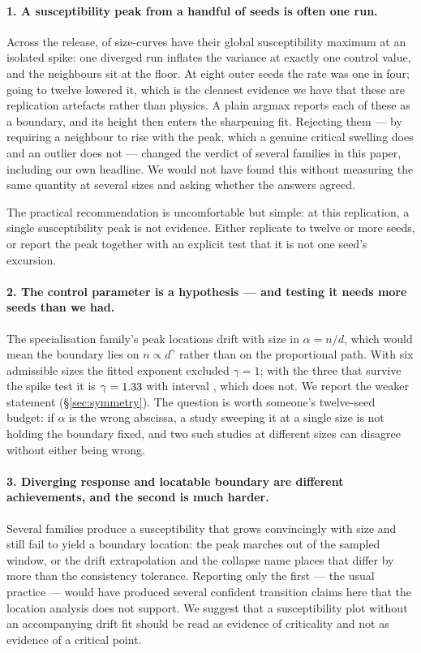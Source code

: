 \paragraph{1. A susceptibility peak from a handful of seeds is often one run.}
Across the release, \AtlasSpikeRejected{} of \AtlasSpikeTotal{} size-curves have
their global susceptibility maximum at an isolated spike: one diverged run
inflates the variance at exactly one control value, and the neighbours sit at
the floor. At eight outer seeds the rate was one in four; going to twelve
lowered it, which is the cleanest evidence we have that these are replication
artefacts rather than physics. A plain argmax reports each of these as a boundary, and its
height then enters the sharpening fit. Rejecting them --- by requiring a
neighbour to rise with the peak, which a genuine critical swelling does and an
outlier does not --- changed the verdict of several families in this paper,
including our own headline. We would not have found this without measuring the
same quantity at several sizes and asking whether the answers agreed.

The practical recommendation is uncomfortable but simple: at this replication,
a single susceptibility peak is not evidence. Either replicate to twelve or
more seeds, or report the peak together with an explicit test that it is not
one seed's excursion.

\paragraph{2. The control parameter is a hypothesis --- and testing it needs
more seeds than we had.}
The specialisation family's peak locations drift with size in $\alpha=n/d$,
which would mean the boundary lies on $n\propto d^{\gamma}$ rather than on the
proportional path. With six admissible sizes the fitted exponent excluded
$\gamma=1$; with the three that survive the spike test it is
$\gamma=1.33{}$ with interval
\AtlasSpecializationGammaCI{}, which does not. We report the weaker statement
(\S\ref{sec:symmetry}). The question is worth someone's twelve-seed budget: if
$\alpha$ is the wrong abscissa, a study sweeping it at a single size is not
holding the boundary fixed, and two such studies at different sizes can
disagree without either being wrong.

\paragraph{3. Diverging response and locatable boundary are different
achievements, and the second is much harder.}
Several families produce a susceptibility that grows convincingly with size and
still fail to yield a boundary location: the peak marches out of the sampled
window, or the drift extrapolation and the collapse name places that differ by
more than the consistency tolerance. Reporting only the first --- the usual
practice --- would have produced several confident transition claims here that
the location analysis does not support. We suggest that a susceptibility plot
without an accompanying drift fit should be read as evidence of criticality and
not as evidence of a critical point.

